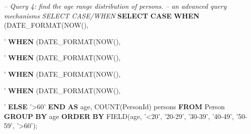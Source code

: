 \documentclass[
]{article}
\newenvironment{Shaded}{\begin{snugshade}}{\end{snugshade}}
\newcommand{\CommentTok}[1]{\textcolor[rgb]{0.56,0.35,0.01}{\textit{#1}}}
\newcommand{\ControlFlowTok}[1]{\textcolor[rgb]{0.13,0.29,0.53}{\textbf{#1}}}
\newcommand{\DecValTok}[1]{\textcolor[rgb]{0.00,0.00,0.81}{#1}}
\newcommand{\FunctionTok}[1]{\textcolor[rgb]{0.00,0.00,0.00}{#1}}
\newcommand{\KeywordTok}[1]{\textcolor[rgb]{0.13,0.29,0.53}{\textbf{#1}}}
\newcommand{\NormalTok}[1]{#1}
\newcommand{\OperatorTok}[1]{\textcolor[rgb]{0.81,0.36,0.00}{\textbf{#1}}}
\newcommand{\StringTok}[1]{\textcolor[rgb]{0.31,0.60,0.02}{#1}}
\begin{document}
\begin{Shaded}
\begin{Highlighting}[]
\CommentTok{-- Query 4: find the age range distribution of persons.}
\CommentTok{-- an advanced query mechanisms SELECT CASE/WHEN}
\KeywordTok{SELECT} 
  \ControlFlowTok{CASE} \ControlFlowTok{WHEN}\NormalTok{ (DATE_FORMAT(NOW(), }\StringTok{'%Y'}\NormalTok{) }\OperatorTok{-}\NormalTok{ DATE_FORMAT(DOB, }\StringTok{'%Y'}\NormalTok{) }\OperatorTok{-}\NormalTok{ (DATE_FORMAT(NOW(), }\StringTok{'00-%m-%d'}\NormalTok{) }\OperatorTok{<}\NormalTok{ DATE_FORMAT(DOB, }\StringTok{'00-%m-%d'}\NormalTok{))) }\OperatorTok{<} \DecValTok{20} \ControlFlowTok{THEN} \StringTok{'<20'}
     \ControlFlowTok{WHEN}\NormalTok{ (DATE_FORMAT(NOW(), }\StringTok{'%Y'}\NormalTok{) }\OperatorTok{-}\NormalTok{ DATE_FORMAT(DOB, }\StringTok{'%Y'}\NormalTok{) }\OperatorTok{-}\NormalTok{ (DATE_FORMAT(NOW(), }\StringTok{'00-%m-%d'}\NormalTok{) }\OperatorTok{<}\NormalTok{ DATE_FORMAT(DOB, }\StringTok{'00-%m-%d'}\NormalTok{))) }\OperatorTok{<} \DecValTok{30} \ControlFlowTok{THEN} \StringTok{'20-29'}
     \ControlFlowTok{WHEN}\NormalTok{ (DATE_FORMAT(NOW(), }\StringTok{'%Y'}\NormalTok{) }\OperatorTok{-}\NormalTok{ DATE_FORMAT(DOB, }\StringTok{'%Y'}\NormalTok{) }\OperatorTok{-}\NormalTok{ (DATE_FORMAT(NOW(), }\StringTok{'00-%m-%d'}\NormalTok{) }\OperatorTok{<}\NormalTok{ DATE_FORMAT(DOB, }\StringTok{'00-%m-%d'}\NormalTok{))) }\OperatorTok{<} \DecValTok{40} \ControlFlowTok{THEN} \StringTok{'30-39'}
     \ControlFlowTok{WHEN}\NormalTok{ (DATE_FORMAT(NOW(), }\StringTok{'%Y'}\NormalTok{) }\OperatorTok{-}\NormalTok{ DATE_FORMAT(DOB, }\StringTok{'%Y'}\NormalTok{) }\OperatorTok{-}\NormalTok{ (DATE_FORMAT(NOW(), }\StringTok{'00-%m-%d'}\NormalTok{) }\OperatorTok{<}\NormalTok{ DATE_FORMAT(DOB, }\StringTok{'00-%m-%d'}\NormalTok{))) }\OperatorTok{<} \DecValTok{50} \ControlFlowTok{THEN} \StringTok{'40-49'}
     \ControlFlowTok{WHEN}\NormalTok{ (DATE_FORMAT(NOW(), }\StringTok{'%Y'}\NormalTok{) }\OperatorTok{-}\NormalTok{ DATE_FORMAT(DOB, }\StringTok{'%Y'}\NormalTok{) }\OperatorTok{-}\NormalTok{ (DATE_FORMAT(NOW(), }\StringTok{'00-%m-%d'}\NormalTok{) }\OperatorTok{<}\NormalTok{ DATE_FORMAT(DOB, }\StringTok{'00-%m-%d'}\NormalTok{))) }\OperatorTok{<} \DecValTok{60} \ControlFlowTok{THEN} \StringTok{'50-59'}
     \ControlFlowTok{ELSE} \StringTok{'>60'} \ControlFlowTok{END} \KeywordTok{AS}\NormalTok{ age,}
     \FunctionTok{COUNT}\NormalTok{(PersonId) persons}
\KeywordTok{FROM}\NormalTok{ Person}
\KeywordTok{GROUP} \KeywordTok{BY}\NormalTok{ age}
\KeywordTok{ORDER} \KeywordTok{BY}\NormalTok{ FIELD(age, }\StringTok{'<20'}\NormalTok{, }\StringTok{'20-29'}\NormalTok{, }\StringTok{'30-39'}\NormalTok{, }\StringTok{'40-49'}\NormalTok{, }\StringTok{'50-59'}\NormalTok{, }\StringTok{'>60'}\NormalTok{);}




}}}}}
\end{Highlighting}
\end{Shaded}
\end{document}
